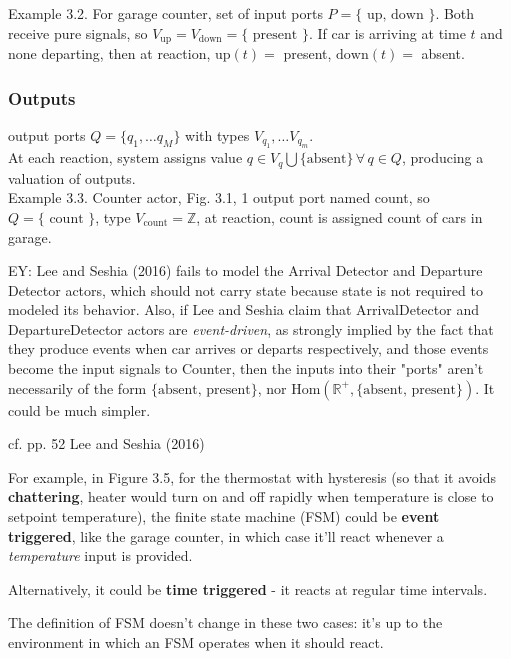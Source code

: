 \documentclass[10pt]{amsart}
\begin{document}
\begin{multicols*}{2}
Example 3.2. For garage counter, set of input ports $P = \lbrace \text{ up, down } \rbrace$. Both receive pure signals, so $V_{\text{up}} = V_{\text{down}} = \lbrace \text{ present } \rbrace$. If car is arriving at time $t$ and none departing, then at reaction, $\text{up}(t) = $ present, $\text{down}(t) = $ absent. \\

\subsubsection{Outputs}

output ports $Q = \lbrace q_1, \dots q_M \rbrace$ with types $V_{q_1}, \dots V_{q_m}$. \\
At each reaction, system assigns value $q\in V_q \bigcup \lbrace \text{absent} \rbrace \, \forall \, q \in Q$, producing a valuation of outputs. \\

Example 3.3. Counter actor, Fig. 3.1, 1 output port named count, so $Q = \lbrace \text{ count } \rbrace$, type $V_{\text{count}} = \mathbb{Z}$, at reaction, count is assigned count of cars in garage.

EY: Lee and Seshia (2016) \cite{LeSe2016} fails to model the Arrival Detector and Departure Detector actors, which should not carry state because state is not required to modeled its behavior. Also, if Lee and Seshia claim that ArrivalDetector and DepartureDetector actors are \emph{event-driven}, as strongly implied by the fact that they produce events when car arrives or departs respectively, and those events become the input signals to Counter, then the inputs into their "ports" aren't necessarily of the form $\lbrace \text{absent, present} \rbrace$, nor $\text{Hom}(\mathbb{R}^+, \lbrace \text{absent, present} \rbrace)$. It could be much simpler. 

cf. pp. 52 Lee and Seshia (2016) \cite{LeSe2016}

For example, in Figure 3.5, for the thermostat with hysteresis (so that it avoids \textbf{chattering}, heater would turn on and off rapidly when temperature is close to setpoint temperature), the finite state machine (FSM) could be \textbf{event triggered}, like the garage counter, in which case it'll react whenever a \emph{temperature} input is provided.

Alternatively, it could be \textbf{time triggered} - it reacts at regular time intervals.

The definition of FSM doesn't change in these two cases: it's up to the environment in which an FSM operates when it should react.


\end{multicols*}
\end{document}
